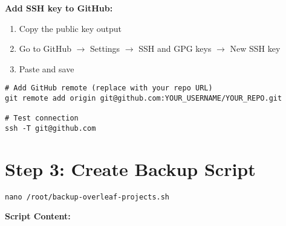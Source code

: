 \textbf{Add SSH key to GitHub:}
\begin{enumerate}
    \item Copy the public key output
    \item Go to GitHub $\rightarrow$ Settings $\rightarrow$ SSH and GPG keys $\rightarrow$ New SSH key
    \item Paste and save
\end{enumerate}

\begin{verbatim}
# Add GitHub remote (replace with your repo URL)
git remote add origin git@github.com:YOUR_USERNAME/YOUR_REPO.git

# Test connection
ssh -T git@github.com
\end{verbatim}

\section{Step 3: Create Backup Script}

\begin{verbatim}
nano /root/backup-overleaf-projects.sh
\end{verbatim}

\textbf{Script Content:}

